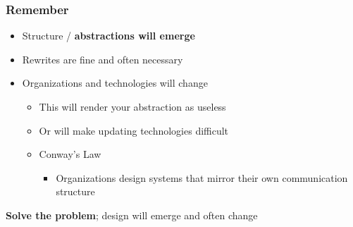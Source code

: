 
\begin{frame}
  \frametitle{Remember}
  \begin{itemize}
    \item Structure / \textbf{abstractions will emerge}
    \pause
    \item Rewrites are fine and often necessary
    \pause
    \item Organizations and technologies will change
      \begin{itemize}
        \item This will render your abstraction as useless
        \item Or will make updating technologies difficult
        \item Conway's Law
          \begin{itemize}
            \item Organizations design systems that mirror their own communication structure
          \end{itemize}
      \end{itemize}
  \end{itemize}

  \pause
  \vspace{1em}
  \textbf{Solve the problem}; design will emerge and often change
\end{frame}
